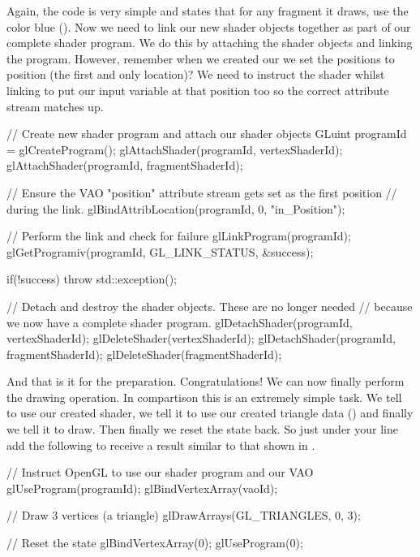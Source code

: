 \documentclass[10pt]{article}
\begin{document}
Again, the  code is very simple and states that for any
fragment it draws, use the color blue (). Now we
need to link our new shader objects together as part of our complete
shader program.  We do this by attaching the shader objects and linking
the program. However, remember when we created our  we set
the positions  to position  (the first and only
location)? We need to instruct the shader whilst linking to put our
input variable  at that position too so the correct
attribute stream matches up.

\begin{Code}
  // Create new shader program and attach our shader objects
  GLuint programId = glCreateProgram();
  glAttachShader(programId, vertexShaderId);
  glAttachShader(programId, fragmentShaderId);

  // Ensure the VAO "position" attribute stream gets set as the first position
  // during the link.
  glBindAttribLocation(programId, 0, "in_Position");

  // Perform the link and check for failure
  glLinkProgram(programId);
  glGetProgramiv(programId, GL_LINK_STATUS, &success);

  if(!success)
  {
    throw std::exception();
  }

  // Detach and destroy the shader objects. These are no longer needed
  // because we now have a complete shader program.
  glDetachShader(programId, vertexShaderId);
  glDeleteShader(vertexShaderId);
  glDetachShader(programId, fragmentShaderId);
  glDeleteShader(fragmentShaderId);
\end{Code}

And that is it for the preparation. Congratulations! We can now finally
perform the drawing operation.  In compartison this is an extremely
simple task. We tell  to use our created shader, we tell
it to use our created triangle data () and finally we tell
it to draw. Then finally we reset the state back. So just under your
 line add the following to receive a result similar to
that shown in .

\begin{Code}
  // Instruct OpenGL to use our shader program and our VAO
  glUseProgram(programId);
  glBindVertexArray(vaoId);

  // Draw 3 vertices (a triangle)
  glDrawArrays(GL_TRIANGLES, 0, 3);

  // Reset the state
  glBindVertexArray(0);
  glUseProgram(0);
\end{Code}
\end{document}
